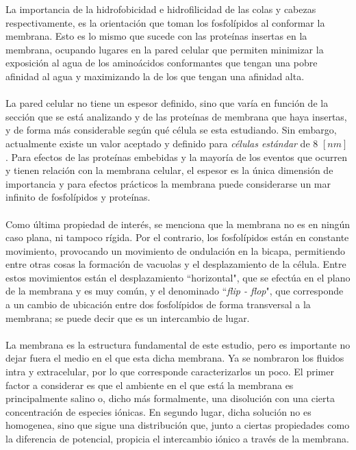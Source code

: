 \documentclass[12pt, notitlepage]{article}
\numberwithin{equation}{section}
\begin{document}
La importancia de la hidrofobicidad e hidrofilicidad de las colas y cabezas respectivamente, es la orientación que toman los fosfolípidos al conformar la membrana. Esto es lo mismo que sucede con las proteínas insertas en la membrana, ocupando lugares en la pared celular que permiten minimizar la exposición al agua de los aminoácidos conformantes que tengan una pobre afinidad al agua y maximizando la de los que tengan una afinidad alta.\\\\
La pared celular no tiene un espesor definido, sino que varía en función de la sección que se está analizando y de las proteínas de membrana que haya insertas, y de forma más considerable según qué célula se esta estudiando. Sin embargo, actualmente existe un valor aceptado y definido para \textit{células estándar} de 8 $[nm]$ \cite{Lombard}. Para efectos de las proteínas embebidas y la mayoría de los eventos que ocurren y tienen relación con la membrana celular, el espesor es la única dimensión de importancia y para efectos prácticos la membrana puede considerarse un mar infinito de fosfolípidos y proteínas.\\\\
Como última propiedad de interés, se menciona que la membrana no es en ningún caso plana, ni tampoco rígida. Por el contrario, los fosfolípidos están en constante movimiento, provocando un movimiento de ondulación en la bicapa, permitiendo entre otras cosas la formación de vacuolas y el desplazamiento de la célula. Entre estos movimientos están el desplazamiento ``horizontal", que se efectúa en el plano de la membrana y es muy común, y el denominado ``\textit{flip - flop}", que corresponde a un cambio de ubicación entre dos fosfolípidos de forma transversal a la membrana; se puede decir que es un intercambio de lugar.\\\\
La membrana es la estructura fundamental de este estudio, pero es importante no dejar fuera el medio en el que esta dicha membrana. Ya se nombraron los fluidos intra y extracelular, por lo que corresponde caracterizarlos un poco. El primer factor a considerar es que el ambiente en el que está la membrana es principalmente salino o, dicho más formalmente, una disolución con una cierta concentración de especies iónicas. En segundo lugar, dicha solución no es homogenea, sino que sigue una distribución que, junto a ciertas propiedades como la diferencia de potencial, propicia el intercambio iónico a través de la membrana.
\end{document}

